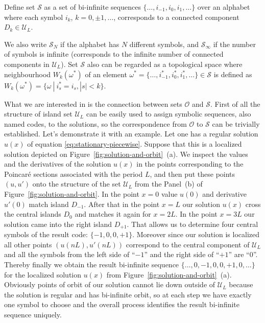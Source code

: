 \begin{definition}
	Define set $\mathcal{S}$ as a set of bi-infinite sequences $\{ \dots, i_{-1}, i_0, i_1, \dots \}$ over an alphabet where each symbol $i_k$, $k = 0, \pm 1, \dots$, corresponds to a connected component $D_k \in \mathscr{U}_L$.
\end{definition}

We also write $\mathcal{S}_N$ if the alphabet has $N$ different symbols, and $\mathcal{S}_{\infty}$ if the number of symbols is infinite (corresponds to the infinite number of connected components in $\mathscr{U}_L$).
Set $\mathcal{S}$ also can be regarded as a topological space where neighbourhood $W_k(\omega^*)$ of an element $\omega^* = \{ \dots, i_{-1}^*, i_0^*, i_1^*, \dots \} \in \mathcal{S}$ is defined as $W_k(\omega^*) = \{ \omega \ | \ i_s^* = i_s, |s| < k \}$.

What we are interested in is the connection between sets $\mathcal{O}$ and $\mathcal{S}$.
First of all the structure of island set $\mathscr{U}_L$ can be easily used to assign symbolic sequences, also named codes, to the solutions, so the correspondence from $\mathcal{O}$ to $\mathcal{S}$ can be trivially established.
Let's demonstrate it with an example.
Let one has a regular solution $u(x)$ of equation \eqref{eq:stationary-piecewise}.
Suppose that this is a localized solution depicted on Figure~\ref{fig:solution-and-orbit}~(a).
We inspect the values and the derivatives of the solution $u(x)$ in the points corresponding to the Poincar\'e sections associated with the period $L$, and then put these points $(u, u')$ onto the structure of the set $\mathscr{U}_L$ from the Panel~(b) of Figure~\ref{fig:solution-and-orbit}.
In the point $x = 0$ value $u(0)$ and derivative $u'(0)$ match island $D_{-1}$.
After that in the point $x = L$ our solution $u(x)$ cross the central islands $D_0$ and matches it again for $x = 2L$.
In the point $x = 3L$ our solution came into the right island $D_{+1}$.
That allows us to determine four central symbols of the result code: $\{ -1, 0, 0, +1 \}$.
Moreover since our solution is localized all other points $(u(nL), u'(nL))$ correspond to the central component of $\mathscr{U}_L$ and all the symbols from the left side of ``$-1$'' and the right side of ``$+1$'' are ``$0$''.
Thereby finally we obtain the result bi-infinite sequence $\{ \dots, 0, -1, 0, 0, +1, 0, \dots \}$ for the localized solution $u(x)$ from Figure~\ref{fig:solution-and-orbit}~(a).
Obviously points of orbit of our solution cannot lie down outside of  $\mathscr{U}_L$ because the solution is regular and has bi-infinite orbit, so at each step we have exactly one symbol to choose and the overall process identifies the result bi-infinite sequence uniquely.

